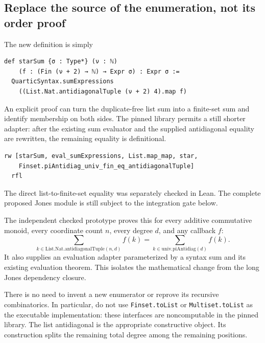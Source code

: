\documentclass[11pt,letterpaper]{article}
\newcommand{\code}[1]{{\small\nolinkurl{#1}}}
\begin{document}
\subsection{Replace the source of the enumeration, not its order proof}

The new definition is simply

\begin{Verbatim}[fontsize=\small,breaklines=true,samepage=true]
def starSum {σ : Type*} (ν : ℕ)
    (f : (Fin (ν + 2) → ℕ) → Expr σ) : Expr σ :=
  QuarticSyntax.sumExpressions
    ((List.Nat.antidiagonalTuple (ν + 2) 4).map f)
\end{Verbatim}

An explicit proof can turn the duplicate-free list sum into a finite-set sum and identify membership on both sides. The pinned library permits a still shorter adapter: after the existing sum evaluator and the supplied antidiagonal equality are rewritten, the remaining equality is definitional.

\begin{Verbatim}[fontsize=\small,breaklines=true,samepage=true]
  rw [starSum, eval_sumExpressions, List.map_map, star,
    Finset.piAntidiag_univ_fin_eq_antidiagonalTuple]
  rfl
\end{Verbatim}

The direct list-to-finite-set equality was separately checked in Lean. The complete proposed Jones module is still subject to the integration gate below.

The independent checked prototype proves this for every additive commutative monoid, every coordinate count $n$, every degree $d$, and any callback $f$:
\begin{equation}
 \sum_{k\in\mathrm{List.Nat.antidiagonalTuple}(n,d)} f(k)
 =\sum_{k\in\mathrm{univ.piAntidiag}(d)} f(k).
 \label{eq:enumerator}
\end{equation}
It also supplies an evaluation adapter parameterized by a syntax sum and its existing evaluation theorem. This isolates the mathematical change from the long Jones dependency closure.

There is no need to invent a new enumerator or reprove its recursive combinatorics. In particular, do not use \code{Finset.toList} or \code{Multiset.toList} as the executable implementation: these interfaces are noncomputable in the pinned library. The list antidiagonal is the appropriate constructive object. Its construction splits the remaining total degree among the remaining positions.
\end{document}
